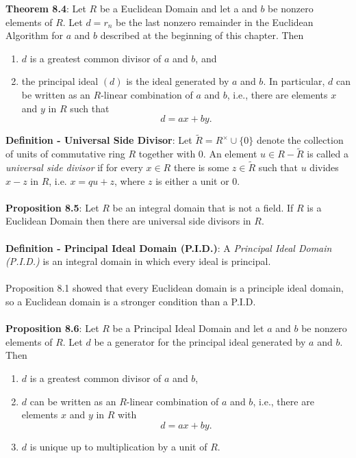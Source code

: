 \documentclass{article}
\begin{document}
\textbf{Theorem 8.4}: Let $R$ be a Euclidean Domain and let a and $b$ be nonzero elements of $R$. Let $d = r_n$ be the last nonzero remainder in the Euclidean Algorithm for $a$ and $b$ described at the beginning of this chapter. Then \begin{enumerate}
    \item $d$ is a greatest common divisor of $a$ and $b$, and
    \item the principal ideal $(d)$ is the ideal generated by $a$ and $b$. In particular, $d$ can be written as an $R$-linear combination of $a$ and $b$, i.e., there are elements $x$ and $y$ in $R$ such that $$d = ax + by.$$
\end{enumerate} $ $ \\
\textbf{Definition - Universal Side Divisor}: Let $\tilde{R} = R^\times \cup \{0\}$ denote the collection of units of commutative ring $R$ together with $0$. An element $u \in R - \tilde{R}$ is called a \textit{universal side divisor} if for every $x \in R$ there is some $z \in \tilde{R}$ such that $u$ divides $x - z$ in $R$, i.e. $x = qu + z$, where $z$ is either a unit or $0$. \\ \\
\textbf{Proposition 8.5}: Let $R$ be an integral domain that is not a field. If $R$ is a Euclidean Domain then there are universal side divisors in $R$. \\ \\
\textbf{Definition - Principal Ideal Domain (P.I.D.)}: A \textit{Principal Ideal Domain (P.I.D.)} is an integral domain in which every ideal is principal. \\ \\
Proposition 8.1 showed that every Euclidean domain is a principle ideal domain, so a Euclidean domain is a stronger condition than a P.I.D. \\ \\
\textbf{Proposition 8.6}: Let $R$ be a Principal Ideal Domain and let $a$ and $b$ be nonzero elements
of $R$. Let $d$ be a generator for the principal ideal generated by $a$ and $b$. Then \begin{enumerate}
    \item $d$ is a greatest common divisor of $a$ and $b$,
    \item $d$ can be written as an $R$-linear combination of $a$ and $b$, i.e., there are elements $x$ and $y$ in $R$ with $$d = ax + by.$$
    \item $d$ is unique up to multiplication by a unit of $R$. 
\end{enumerate} $ $ \\
\end{document}
